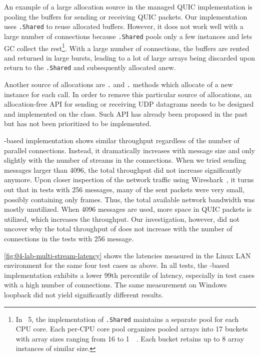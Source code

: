 An example of a large allocation source in the managed QUIC implementation is pooling the buffers
for sending or receiving QUIC packets. Our implementation uses \ArrayPoolOf{\Byte}\texttt{.Shared}
to reuse allocated buffers. However, it does not work well with a large number of connections
because \ArrayPoolOf{\Byte}\texttt{.Shared} pools only a few \ArrayOf{\Byte} instances and lets GC
collect the rest\footnote{In \dotnet{}~5, the implementation of \ArrayPoolOf{\Byte}\texttt{.Shared}
  maintains a separate pool for each CPU core. Each per-CPU core pool organizes pooled arrays into
  17 buckets with array sizes ranging from \SI{16}{\byte} to \SI{1}{\mebi\byte}. Each bucket retains
  up to 8 array instances of similar size.}. With a large number of connections, the buffers are
rented and returned in large bursts, leading to a lot of large arrays being discarded upon return to
the \ArrayPoolOf{\Byte}\texttt{.Shared} and subsequently allocated anew.

Another source of allocations are \Socket{}\texttt{.} and
\Socket{}\texttt{.} methods which allocate of a new  instance
for each call. In order to remove this particular source of allocations, an allocation-free API for
sending or receiving UDP datagrams needs to be designed and implemented on the \Socket{} class. Such
API has already been proposed in the past~\cite{dotnetGithubZeroUdp} but has not been prioritized to
be implemented.

\libmsquic{}-based implementation shows similar throughput regardless of the number of parallel
connections. Instead, it dramatically increases with message size and only slightly with the number
of streams in the connections. When we tried sending messages larger than \SI{4096}{\byte}, the
total throughput did not increase significantly anymore. Upon closer inspection of the \libmsquic{}
network traffic using Wireshark~\cite{web:wireshark}, it turns out that in tests with
\SI{256}{\byte} messages, many of the sent packets were very small, possibly containing only \ACK{}
frames. Thus, the total available network bandwidth was mostly unutilized. When \SI{4096}{\byte}
messages are used, more space in QUIC packets is utilized, which increases the throughput. Our
investigation, however, did not uncover why the total throughput of \libmsquic{} does not increase
with the number of connections in the tests with \SI{256}{\byte} message.

\autoref{fig:04-lab-multi-stream-latency} shows the latencies measured in the Linux LAN environment
for the same four test cases as above. In all tests, the \libmsquic{}-based implementation exhibits
a lower 99th percentile of latency, especially in test cases with a high number of connections. The
same measurement on Windows loopback did not yield significantly different results.

